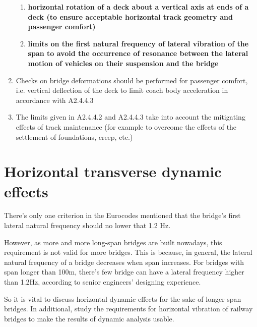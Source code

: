 \begin{enumerate}
\begin{enumerate}[-]
		\item \textbf{horizontal rotation of a deck about a vertical axis at ends of a deck (to ensure acceptable horizontal track geometry and passenger comfort)}
		\item \textbf{limits on the first natural frequency of lateral vibration of the span to avoid the occurrence of resonance between the lateral motion of vehicles on their suspension and the bridge}
	\end{enumerate}
	\item Checks on bridge deformations should be performed for passenger comfort, i.e. vertical deflection of the deck to limit coach body acceleration in accordance with A2.4.4.3\cite{EC0}
	\item The limits given in A2.4.4.2 and A2.4.4.3\cite{EC0} take into account the mitigating effects of track maintenance (for example to overcome the effects of the settlement of foundations, creep, etc.) 
\end{enumerate}


\section{Horizontal transverse dynamic effects}
There's only one criterion in the Eurocodes mentioned that the bridge's first lateral natural frequency should no lower that 1.2 Hz. 

However, as more and more long-span bridges are built nowadays, this requirement is not valid for more bridges. This is because, in general, the lateral natural frequency of a bridge decreases when span increases. For bridges with span longer than 100m, there's few bridge can have a lateral frequency higher than 1.2Hz, according to senior engineers' designing experience.

So it is vital to discuss horizontal dynamic effects for the sake of longer span bridges. In additional, study the requirements for horizontal vibration of railway bridges to make the results of dynamic analysis usable.





